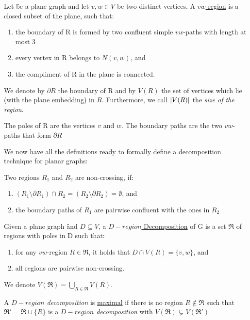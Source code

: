 \begin{definition}
    Let \G be a plane graph and let $v,w \in V$ be two distinct vertices. A \underline{$vw$-region} is a closed subset of the plane, such that:
    \begin{enumerate}
        \item the boundary of R is formed by two confluent simple $vw$-paths with length at most 3
        \item every vertex in R belongs to $N(v,w)$, and 
        \item the compliment of R in the plane is connected.
    \end{enumerate}

    We denote by $\partial R$ the boundary of R and by $V(R)$ the set of vertices which lie (with the plane embedding) in $R$. Furthermore, we call $\abs{V(R)}$ the \textit{size of the region}.

    The poles of R are the vertices $v$ and $w$. The boundary paths are the two $vw$-paths that form $\partial R$ 

\end{definition}


We now have all the definitions ready to formally define a decomposition technique for planar graphs:

\begin{definition}
    Two regions $R_1$ and $R_2$ are non-crossing, if:
    \begin{enumerate}
        \item $(R_1 \setminus \partial R_1) \cap R_2 = (R_2 \setminus \partial R_2) = \emptyset$, and 
        \item the boundary paths of $R_1$ are pairwise confluent with the ones in $R_2$
    \end{enumerate}
\end{definition}

\begin{definition}
    Given a plane graph \G and $D\subseteq V$, a \underline{$D-region$ Decomposition} of G is a set $\mathfrak{R}$ of regions with poles in D such that: 
    \begin{enumerate}
        \item for any $vw$-region $R \in \mathfrak{R} $, it holds that $D \cap V(R) = \{v, w\}$, and
        \item all regions are pairwise non-crossing. 
    \end{enumerate}
    We denote $V(\mathfrak{R}) = \bigcup\limits_{R \in \mathfrak{R}} V(R)$. 
    
    \noindent A \textit{$D-region$ decomposition} is \underline{maximal} if there is no region $R \notin \mathfrak{R}$ such that $\mathfrak{R}' = \mathfrak{R} \cup \{R\}$ is a \textit{$D-region$ decomposition} with $V(\mathfrak{R}) \subsetneq V(\mathfrak{R}')$
\end{definition}



